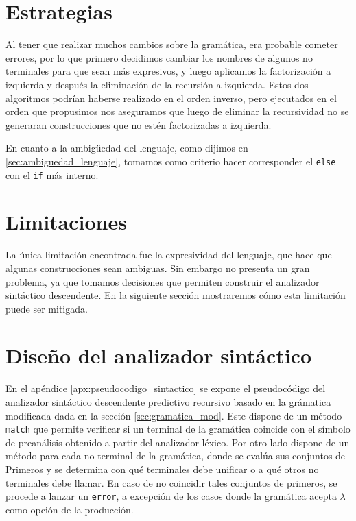 \section{Estrategias}
Al tener que realizar muchos cambios sobre la gramática, era probable cometer errores, por lo que primero decidimos cambiar los nombres de algunos no terminales para que sean más expresivos, y luego aplicamos la factorización a izquierda y después la eliminación de la recursión a izquierda. Estos dos algoritmos podrían haberse realizado en el orden inverso, pero ejecutados en el orden que propusimos nos aseguramos que luego de eliminar la recursividad no se generaran construcciones que no estén factorizadas a izquierda. 

En cuanto a la ambigüedad del lenguaje, como dijimos en \ref{sec:ambiguedad_lenguaje}, tomamos como criterio hacer corresponder el \texttt{else} con el \texttt{if} más interno. 

\section{Limitaciones}
La única limitación encontrada fue la expresividad del lenguaje, que hace que algunas construcciones sean ambiguas. Sin embargo no presenta un gran problema, ya que tomamos decisiones que permiten construir el analizador sintáctico descendente. En la siguiente sección mostraremos cómo esta limitación puede ser mitigada.

\section{Diseño del analizador sintáctico}
\label{sec:diseno_sintactico}
En el apéndice \ref{apx:pseudocodigo_sintactico} se expone el pseudocódigo del analizador sintáctico descendente predictivo recursivo basado en la grámatica modificada dada en la sección \ref{sec:gramatica_mod}. Este dispone de un método \texttt{match} que permite verificar si un terminal de la gramática coincide con el símbolo de preanálisis obtenido a partir del analizador léxico. Por otro lado dispone de un método para cada no terminal de la gramática, donde se evalúa sus conjuntos de Primeros y se determina con qué terminales debe unificar o a qué otros no terminales debe llamar. En caso de no coincidir tales conjuntos de primeros, se procede a lanzar un \texttt{error}, a excepción de los casos donde la gramática acepta $\lambda$ como opción de la producción.



